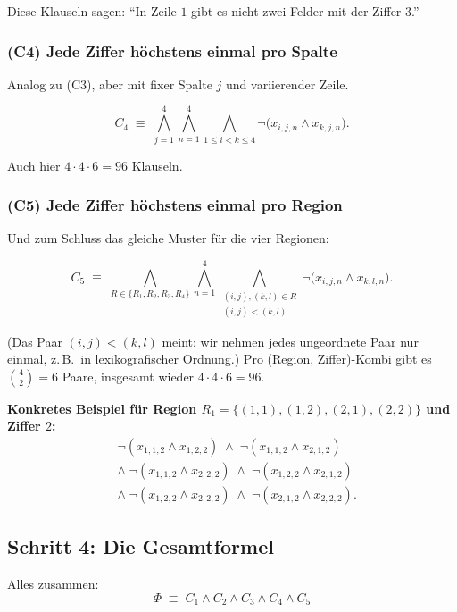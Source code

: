 \documentclass[a4paper,12pt]{article}
\begin{document}
Diese Klauseln sagen: "`In Zeile $1$ gibt es nicht zwei Felder mit
der Ziffer $3$."'

\subsubsection*{(C4) Jede Ziffer h\"ochstens einmal pro Spalte}

Analog zu (C3), aber mit fixer Spalte $j$ und variierender Zeile.

\[
C_4 \;\equiv\;
\bigwedge_{j=1}^{4} \bigwedge_{n=1}^{4}
\bigwedge_{1 \le i < k \le 4}
\neg\bigl(x_{i,j,n} \wedge x_{k,j,n}\bigr).
\]

Auch hier $4 \cdot 4 \cdot 6 = 96$ Klauseln.

\subsubsection*{(C5) Jede Ziffer h\"ochstens einmal pro Region}

Und zum Schluss das gleiche Muster f\"ur die vier Regionen:

\[
C_5 \;\equiv\;
\bigwedge_{R \in \{R_1, R_2, R_3, R_4\}}
\bigwedge_{n=1}^{4}
\bigwedge_{\substack{(i,j), (k,l) \in R \\ (i,j) < (k,l)}}
\neg\bigl(x_{i,j,n} \wedge x_{k,l,n}\bigr).
\]

(Das Paar $(i,j) < (k,l)$ meint: wir nehmen jedes ungeordnete Paar nur
einmal, z.\,B.\ in lexikografischer Ordnung.) Pro (Region,
Ziffer)-Kombi gibt es $\binom{4}{2} = 6$ Paare, insgesamt wieder
$4 \cdot 4 \cdot 6 = 96$.

\textbf{Konkretes Beispiel f\"ur Region $R_1 = \{(1,1), (1,2), (2,1),
(2,2)\}$ und Ziffer $2$:}
\begin{align*}
& \neg(x_{1,1,2} \wedge x_{1,2,2}) \;\wedge\; \neg(x_{1,1,2} \wedge x_{2,1,2}) \\
& \wedge\; \neg(x_{1,1,2} \wedge x_{2,2,2}) \;\wedge\; \neg(x_{1,2,2} \wedge x_{2,1,2}) \\
& \wedge\; \neg(x_{1,2,2} \wedge x_{2,2,2}) \;\wedge\; \neg(x_{2,1,2} \wedge x_{2,2,2}).
\end{align*}

\subsection*{Schritt 4: Die Gesamtformel}

Alles zusammen:
\[
\boxed{\;\Phi \;\equiv\; C_1 \wedge C_2 \wedge C_3 \wedge C_4 \wedge C_5\;}
\]
\end{document}
